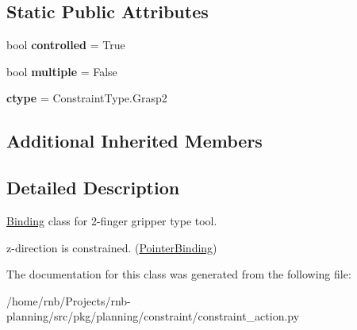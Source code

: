 \subsection*{Static Public Attributes}
\begin{DoxyCompactItemize}
\item 
\mbox{\label{classrnb-planning_1_1src_1_1pkg_1_1planning_1_1constraint_1_1constraint__action_1_1_gripper2_tool_ab80ddfcb1312350e7d546bf6079bc6fb}} 
bool {\bfseries controlled} = True
\item 
\mbox{\label{classrnb-planning_1_1src_1_1pkg_1_1planning_1_1constraint_1_1constraint__action_1_1_gripper2_tool_aaf8bad3a021490a1095a670d23845baf}} 
bool {\bfseries multiple} = False
\item 
\mbox{\label{classrnb-planning_1_1src_1_1pkg_1_1planning_1_1constraint_1_1constraint__action_1_1_gripper2_tool_a7ddf284603f3a8c42741647adfea6283}} 
{\bfseries ctype} = Constraint\+Type.\+Grasp2
\end{DoxyCompactItemize}
\subsection*{Additional Inherited Members}


\subsection{Detailed Description}
\hyperlink{classrnb-planning_1_1src_1_1pkg_1_1planning_1_1constraint_1_1constraint__action_1_1_binding}{Binding} class for 2-\/finger gripper type tool. 

z-\/direction is constrained. (\hyperlink{classrnb-planning_1_1src_1_1pkg_1_1planning_1_1constraint_1_1constraint__action_1_1_pointer_binding}{Pointer\+Binding}) 

The documentation for this class was generated from the following file\+:\begin{DoxyCompactItemize}
\item 
/home/rnb/\+Projects/rnb-\/planning/src/pkg/planning/constraint/constraint\+\_\+action.\+py\end{DoxyCompactItemize}
